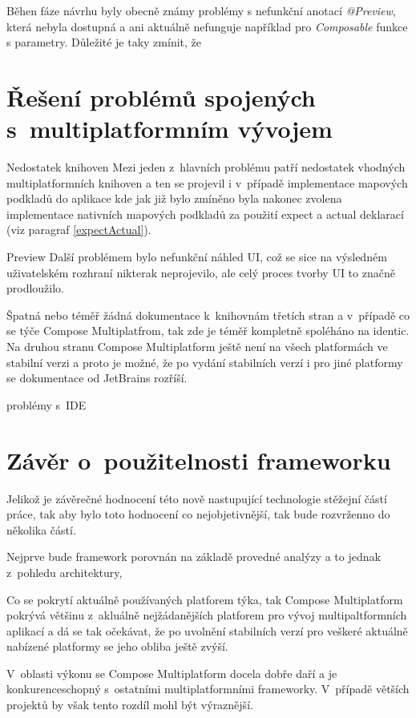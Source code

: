 Běhen fáze návrhu byly obecně známy problémy s nefunkční anotací \textit{@Preview}, která nebyla dostupná a ani aktuálně nefunguje například pro 
\textit{Composable} funkce s parametry. \cite{previewCompose} Důležité je taky zmínit, že 

\section{Řešení problémů spojených s~multiplatformním vývojem} %
Nedostatek knihoven
Mezi jeden z~hlavních problému patří nedostatek vhodných multiplatformních knihoven a ten se projevil i v~případě implementace mapových podkladů
do aplikace kde jak již bylo zmíněno byla nakonec zvolena implementace nativních mapových podkladů za použití expect a actual deklarací (viz paragraf \ref{expectActual}).

Preview
Další problémem bylo nefunkční náhled UI, což se sice na výsledném uživatelském rozhraní nikterak neprojevilo, ale celý proces tvorby UI to značně 
prodloužilo.

Špatná nebo téměř žádná dokumentace k~knihovnám třetích stran a v~případě co se týče Compose Multiplatfrom, tak zde je téměř kompletně spoléháno na
identic. 
Na druhou stranu Compose Multiplatform ještě není na všech platformách ve stabilní verzi a proto je možné, že po vydání stabilních verzí i pro jiné
platformy se dokumentace od JetBrains rozříší.

problémy s~IDE 

\section{Závěr o~použitelnosti frameworku}
Jelikož je závěrečné hodnocení této nově nastupující technologie stěžejní částí práce, tak aby bylo toto hodnocení co 
nejobjetivnější, tak bude rozvrženno do několika částí.

Nejprve bude framework porovnán na základě provedné analýzy a to jednak z~pohledu architektury, 

Co se pokrytí aktuálně používaných platforem týka, tak Compose Multiplatform pokrývá většinu z~akluálně nejžádanějších 
platforem pro vývoj multipaltformních aplikací a dá se tak očekávat, že po uvolnění stabilních verzí pro veškeré 
aktuálně nabízené platformy se jeho obliba ještě zvýší. 

V~oblasti výkonu se Compose Multiplatform docela dobře daří a je konkurenceschopný s~ostatními multiplatformními frameworky.
V~případě větších projektů by však tento rozdíl mohl být výraznější.

